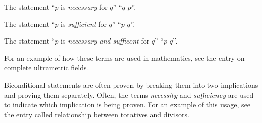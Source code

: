 \documentclass[12pt]{article}
\begin{document}

The statement ``$p$ is {\sl necessary\/} for $q$''  ``$q$  $p$''.

The statement ``$p$ is {\sl sufficient\/} for $q$''  ``$p$  $q$''.

The statement ``$p$ is {\sl necessary and sufficent\/} for $q$''  ``$p$  $q$''.

For an example of how these terms are used in mathematics, see the entry on complete ultrametric fields.

Biconditional statements are often proven by breaking them into two implications and proving them separately.  Often, the terms \emph{necessity} and \emph{sufficiency} are used to indicate which implication is being proven.  For an example of this usage, see the entry called relationship between totatives and divisors.
\end{document}
